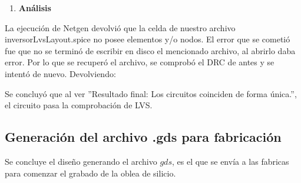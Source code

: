 
\begin{enumerate}[resume]
    \item \textbf{Análisis}
\end{enumerate}
\sangria{}La ejecución de Netgen devolvió que la celda de nuestro archivo inversorLvsLayout.spice no posee elementos y/o nodos. El error que se cometió fue que no se terminó de escribir en disco el mencionado archivo, al abrirlo daba error. Por lo que se recuperó el archivo, se comprobó el DRC de antes y se intentó de nuevo. Devolviendo:

\sangria{} Se concluyó que al ver ''Resultado final: Los circuitos coinciden de forma única.'', el circuito pasa la comprobación de LVS.




\subsection{Generación del archivo .gds para fabricación}
\sangria{} Se concluye el diseño generando el archivo $gds$, es el que se envía a las fabricas para comenzar el grabado de la oblea de silicio.

